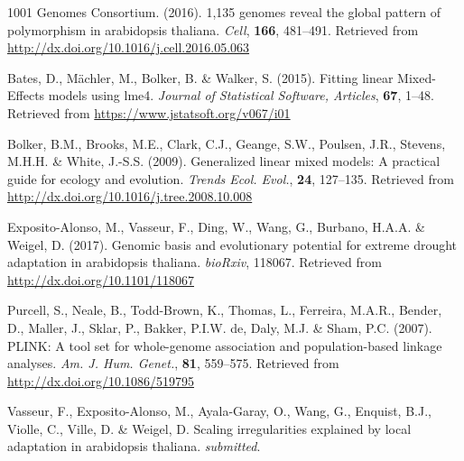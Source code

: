 \documentclass[12pt,]{article}
\begin{document}
\hypertarget{refs}{}
\hypertarget{ref-1001_Genomes_Consortium2016-nw}{}
1001 Genomes Consortium. (2016). 1,135 genomes reveal the global pattern
of polymorphism in arabidopsis thaliana. \emph{Cell}, \textbf{166},
481--491. Retrieved from
\url{http://dx.doi.org/10.1016/j.cell.2016.05.063}

\hypertarget{ref-Bates2015-ly}{}
Bates, D., Mächler, M., Bolker, B. \& Walker, S. (2015). Fitting linear
Mixed-Effects models using lme4. \emph{Journal of Statistical Software,
Articles}, \textbf{67}, 1--48. Retrieved from
\url{https://www.jstatsoft.org/v067/i01}

\hypertarget{ref-Bolker2009-by}{}
Bolker, B.M., Brooks, M.E., Clark, C.J., Geange, S.W., Poulsen, J.R.,
Stevens, M.H.H. \& White, J.-S.S. (2009). Generalized linear mixed
models: A practical guide for ecology and evolution. \emph{Trends Ecol.
Evol.}, \textbf{24}, 127--135. Retrieved from
\url{http://dx.doi.org/10.1016/j.tree.2008.10.008}

\hypertarget{ref-Exposito-Alonso2017-ob}{}
Exposito-Alonso, M., Vasseur, F., Ding, W., Wang, G., Burbano, H.A.A. \&
Weigel, D. (2017). Genomic basis and evolutionary potential for extreme
drought adaptation in arabidopsis thaliana. \emph{bioRxiv}, 118067.
Retrieved from \url{http://dx.doi.org/10.1101/118067}

\hypertarget{ref-Purcell2007-wl}{}
Purcell, S., Neale, B., Todd-Brown, K., Thomas, L., Ferreira, M.A.R.,
Bender, D., Maller, J., Sklar, P., Bakker, P.I.W. de, Daly, M.J. \&
Sham, P.C. (2007). PLINK: A tool set for whole-genome association and
population-based linkage analyses. \emph{Am. J. Hum. Genet.},
\textbf{81}, 559--575. Retrieved from
\url{http://dx.doi.org/10.1086/519795}

\hypertarget{ref-Vasseur_undated-oa}{}
Vasseur, F., Exposito-Alonso, M., Ayala-Garay, O., Wang, G., Enquist,
B.J., Violle, C., Ville, D. \& Weigel, D. Scaling irregularities
explained by local adaptation in arabidopsis thaliana. \emph{submitted}.
\end{document}
